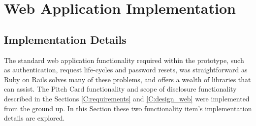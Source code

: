 \chapter{Web Application Implementation}\label{C:webApplicationImplementation}

\section{Implementation Details}
The standard web application functionality required within the prototype, such as authentication, request life-cycles and password resets, was straightforward as Ruby on Rails solves many of these problems, and offers a wealth of libraries that can assist. The Pitch Card functionality and scope of disclosure functionality described in the Sections \ref{C:requirements} and \ref{C:design_web} were implemented from the ground up. In this Section these two functionality item's implementation details are explored.


